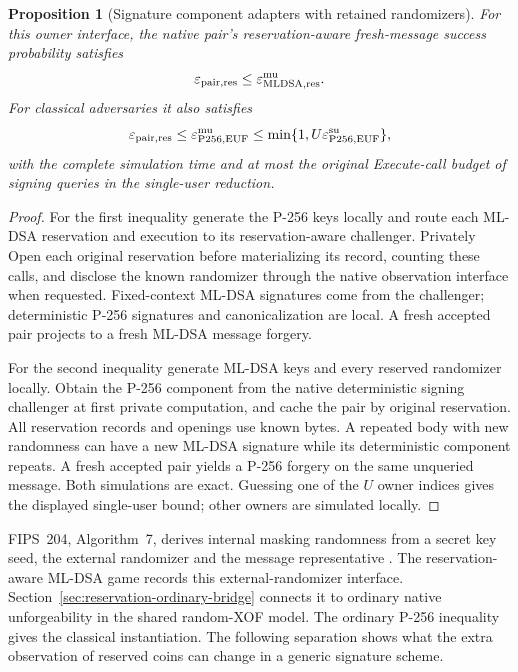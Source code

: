 \documentclass[pdflatex]{sn-jnl}
\theoremstyle{thmstyleone}
\newtheorem{proposition}[theorem]{Proposition}
\theoremstyle{thmstylethree}
\theoremstyle{thmstyletwo}
\begin{document}
\begin{proposition}[Signature component adapters with retained randomizers]
\label{prop:reservation-signature-components}
For this owner interface, the native pair's reservation-aware fresh-message
success probability satisfies
\[
 \varepsilon_{\rm pair,res}
 \le\varepsilon_{\rm MLDSA,res}^{\rm mu}.
\]
For classical adversaries it also satisfies
\[
 \varepsilon_{\rm pair,res}
 \le\varepsilon_{\rm P256,EUF}^{\rm mu}
 \le\min\{1,U\varepsilon_{\rm P256,EUF}^{\rm su}\},
\]
with the complete simulation time and at most the original Execute-call
budget of signing queries in the single-user reduction.
\end{proposition}
\begin{proof}
For the first inequality generate the P-256 keys locally and route each
ML-DSA reservation and execution to its reservation-aware challenger.
Privately Open each original reservation before materializing its record,
counting these calls, and disclose the known randomizer through the
native observation interface when requested. Fixed-context ML-DSA
signatures come from the challenger; deterministic P-256 signatures and
canonicalization are local. A fresh accepted pair projects to a fresh
ML-DSA message forgery.

For the second inequality generate ML-DSA keys and every reserved
randomizer locally. Obtain the P-256 component from the native
deterministic signing challenger at first private computation, and cache
the pair by original reservation. All reservation records and openings
use known bytes. A repeated body with new randomness can have a new
ML-DSA signature while its deterministic component repeats. A fresh
accepted pair yields a P-256 forgery on the same unqueried message.
Both simulations are exact. Guessing one of the $U$ owner indices gives
the displayed single-user bound; other owners are simulated locally.
\end{proof}

FIPS~204, Algorithm~7, derives internal masking randomness from a secret
key seed, the external randomizer and the message representative
\cite{fips204}. The reservation-aware ML-DSA game records this
external-randomizer interface. Section~\ref{sec:reservation-ordinary-bridge}
connects it to ordinary native unforgeability in the shared random-XOF
model. The ordinary P-256 inequality gives the classical instantiation.
The following separation shows what the extra observation of reserved
coins can change in a generic signature scheme.
\end{document}
